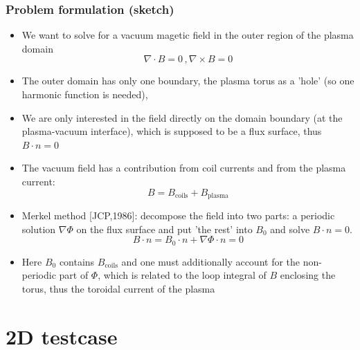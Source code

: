 \documentclass[aspectratio=169]{beamer}
\newcommand{\textc}[1]{\textcolor{iagcolor}{#1}}
\begin{document}
\begin{frame}
  \frametitle{Problem formulation (sketch)} 
  \small
   
\begin{itemize}
  \item We want to solve for a vacuum magetic field in the outer region of the plasma domain
 \begin{equation*}
  \nabla \cdot B = 0 \,,\nabla \times B =0
 \end{equation*}
 \item The outer domain has only one boundary, the plasma torus as a 'hole' (so one harmonic function is needed), 
 \item We are only interested in the field directly on the domain boundary (at the plasma-vacuum interface), which is supposed to be a flux surface, thus $B\cdot n=0$
 \item The vacuum field has a contribution from coil currents and from the plasma current:
 \begin{equation*}
 B=B_\text{coils} + B_\text{plasma}
\end{equation*}
 \item \textc{Merkel method [JCP,1986]}: decompose the field into two parts: a periodic solution $\nabla\Phi$ on the flux surface and put 'the rest' into $B_0$ and solve $B\cdot n =0$.
 \begin{equation*}
 B\cdot n =B_0\cdot n + \nabla\Phi\cdot n = 0
\end{equation*}
\item Here $B_0$ contains $B_\text{coils}$ and one must additionally account for the non-periodic part of $\Phi$, which is related to the loop integral of $B$ enclosing the torus, thus the toroidal current of the plasma
\end{itemize}
   
\end{frame}

\section{2D testcase}
\end{document}
